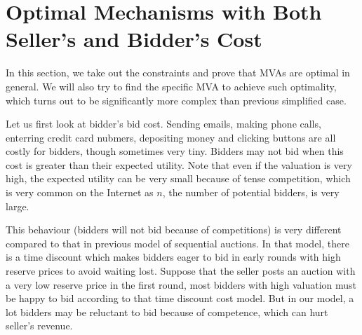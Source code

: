 \section{Optimal Mechanisms with Both Seller's and Bidder's Cost}
\label{sec:general}

In this section, we take out the constraints and prove that MVAs are optimal in
general. We will also try to find the specific MVA to achieve such optimality,
which turns out to be significantly more complex than previous
simplified case.

Let us first look at bidder's bid cost.  Sending emails, making phone
calls, enterring credit card nubmers, depositing money and clicking buttons are
all costly for bidders, though sometimes very tiny.  Bidders may not bid when
this cost is greater than their expected utility. Note that even if the
valuation is very high, the expected utility can be very small because of tense
competition, which is very common on the Internet as $n$, the number of
potential bidders, is very large.


This behaviour (bidders will not bid because of competitions) is very different
compared to that in previous model \cite{McAfee97:SequentialAuctions} of
sequential auctions. In that model, there is a time discount which
makes bidders eager to bid in early rounds with high reserve prices to avoid
waiting lost. 
Suppose that the seller posts an auction with a very low reserve price in
the first round, most bidders with high valuation must be happy to bid
according to that time discount cost model. But in our model, a lot bidders
may be reluctant to bid because of competence, which can hurt seller's revenue.

